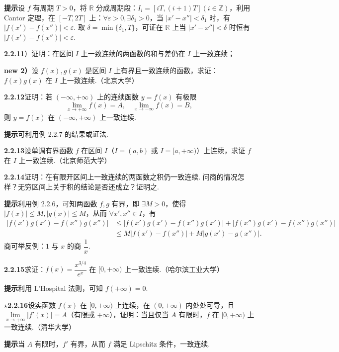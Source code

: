 \documentclass[UTF8,12pt,a4paper,fontset=fandol]{ctexart}
\begin{document}
\noindent\textbf{提示}\quad 设 $f$ 有周期 $T>0$，将 $\mathbb{R}$ 分成周期段：$I_i=[iT,(i+1)T](i\in\mathbb{Z})$，利用 Cantor 定理，在 $[-T,2T]$ 上：$\forall\varepsilon>0,\exists\delta_1>0$，当 $|x'-x''|<\delta_1$ 时，有 $|f(x')-f(x'')|<\varepsilon$. 取 $\delta=\min\{\delta_1,T\}$，可证在 $\mathbb{R}$ 上当 $|x'-x''|<\delta$ 时恒有 $|f(x')-f(x'')|<\varepsilon$.

\noindent\textbf{2.2.11}）证明：在区间 $I$ 上一致连续的两函数的和与差仍在 $I$ 上一致连续；

\noindent\textbf{new 2）}\quad 设 $f(x),g(x)$ 是区间 $I$ 上有界且一致连续的函数，求证：$f(x)g(x)$ 在 $I$ 上一致连续.（北京大学）

\noindent\textbf{2.2.12}\quad 证明：若 $(-\infty,+\infty)$ 上的连续函数 $y=f(x)$ 有极限
\[
  \lim_{x\to+\infty}f(x)=A,\quad \lim_{x\to-\infty}f(x)=B,
\]
则 $y=f(x)$ 在 $(-\infty,+\infty)$ 上一致连续.

\noindent\textbf{提示}\quad 可利用例 2.2.7 的结果或证法.

\noindent\textbf{2.2.13}\quad 设单调有界函数 $f$ 在区间 $I$（$I=(a,b)$ 或 $I=[a,+\infty)$）上连续，求证 $f$ 在 $I$ 上一致连续.（北京师范大学）

\noindent\textbf{2.2.14}\quad 证明：在有限开区间上一致连续的两函数之积仍一致连续. 问商的情况怎样？无穷区间上关于积的结论是否还成立？证明之.

\noindent\textbf{提示}\quad 利用例 2.2.6，可知两函数 $f,g$ 有界，即 $\exists M>0$，使得 $|f(x)|\le M,|g(x)|\le M$，从而 $\forall x',x''\in I$，有
\[
\begin{aligned}
|f(x')g(x')-f(x'')g(x'')|
&\le |f(x')g(x')-f(x'')g(x')|+|f(x'')g(x')-f(x'')g(x'')|\\
&\le M|f(x')-f(x'')|+M|g(x')-g(x'')|.
\end{aligned}
\]
商可举反例：$1$ 与 $x$ 的商 $\dfrac1x$.

\noindent\textbf{2.2.15}\quad 求证：$f(x)=\dfrac{x^{3/4}}{e^x}$ 在 $[0,+\infty)$ 上一致连续.（哈尔滨工业大学）

\noindent\textbf{提示}\quad 利用 L'Hospital 法则，可知 $f(+\infty)=0$.

\noindent\textbf{$\star$2.2.16}\quad 设实函数 $f(x)$ 在 $[0,+\infty)$ 上连续，在 $(0,+\infty)$ 内处处可导，且 $\lim\limits_{x\to+\infty}|f'(x)|=A$（有限或 $+\infty$），证明：当且仅当 $A$ 有限时，$f$ 在 $[0,+\infty)$ 上一致连续.（清华大学）

\noindent\textbf{提示}\quad 当 $A$ 有限时，$f'$ 有界，从而 $f$ 满足 Lipschitz 条件，一致连续.
\end{document}
